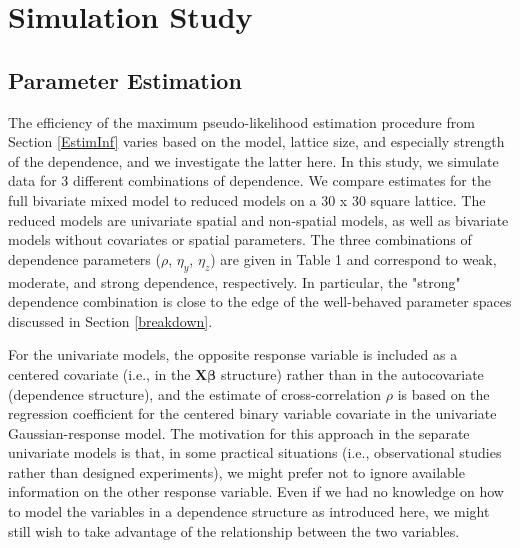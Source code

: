 \documentclass[12pt, a4paper, twoside]{article}
\begin{document}
\section{Simulation Study}\label{SimStudy}
\subsection{Parameter Estimation} \label{ParEstSim}
The efficiency of the maximum pseudo-likelihood estimation procedure from Section \ref{EstimInf} varies based on the model, lattice size, and especially strength of the dependence, and we investigate the latter here. In this study, we simulate data for 3 different combinations of dependence. We compare estimates for the full bivariate mixed model to reduced models on a 30 x 30 square lattice. The reduced models are univariate spatial and non-spatial models, as well as bivariate models without covariates or spatial parameters. The three combinations of dependence parameters ($\rho$, $\eta_y$, $\eta_z$) are given in Table 1 and correspond to weak, moderate, and strong dependence, respectively. In particular, the "strong" dependence combination is close to the edge of the well-behaved parameter spaces discussed in Section \ref{breakdown}.

For the univariate models, the opposite response variable is included as a centered covariate (i.e., in the $\boldsymbol{X\beta}$ structure) rather than in the autocovariate (dependence structure), and the estimate of cross-correlation $\rho$ is based on the regression coefficient for the centered binary variable covariate in the univariate Gaussian-response model. The motivation for this approach in the separate univariate models is that, in some practical situations (i.e., observational studies rather than designed experiments), we might prefer not to ignore available information on the other response variable. Even if we had no knowledge on how to model the variables in a dependence structure as introduced here, we might still wish to take advantage of the relationship between the two variables.
\end{document}
